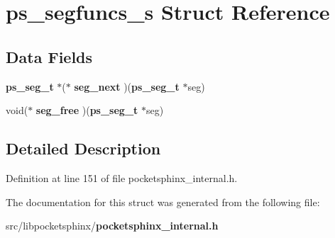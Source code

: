 \section{ps\-\_\-segfuncs\-\_\-s \-Struct \-Reference}
\label{structps__segfuncs__s}
\subsection*{\-Data \-Fields}
\begin{DoxyCompactItemize}
\item 
{\bf ps\-\_\-seg\-\_\-t} $\ast$($\ast$ {\bfseries seg\-\_\-next} )({\bf ps\-\_\-seg\-\_\-t} $\ast$seg)\label{structps__segfuncs__s_a8d9d7ccdb757620830d352d5fece4119}

\item 
void($\ast$ {\bfseries seg\-\_\-free} )({\bf ps\-\_\-seg\-\_\-t} $\ast$seg)\label{structps__segfuncs__s_abbc6c03c53212c4b973f3a0e4121e2ba}

\end{DoxyCompactItemize}


\subsection{\-Detailed \-Description}


\-Definition at line 151 of file pocketsphinx\-\_\-internal.\-h.



\-The documentation for this struct was generated from the following file\-:\begin{DoxyCompactItemize}
\item 
src/libpocketsphinx/{\bf pocketsphinx\-\_\-internal.\-h}\end{DoxyCompactItemize}
